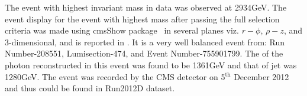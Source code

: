 The event with highest \gamjet invariant mass in data was observed at 2934\unit{GeV}. The event display for the event with highest mass
after passing the full selection criteria was made using cmsShow package~\cite{Web:cmsShow} in several planes viz. $r-\phi$, $\rho-z$, and 
3-dimensional, and is reported in \fig{\ref{fig:EventDisplay}}. It is a very well balanced \gamjet event from: Run Number-208551, 
Lumisection-474, and Event Number-755901799. The \pt of the photon reconstructed in this event was found to be 1361\unit{GeV} and that of jet was 
1280\unit{GeV}. The event was recorded by the CMS detector on 5$^{\mathrm{th}}$ December 2012 and thus could be found in Run2012D dataset. 
\begin{figure}[h!]
\centering
  \\
  \\

\end{figure}
